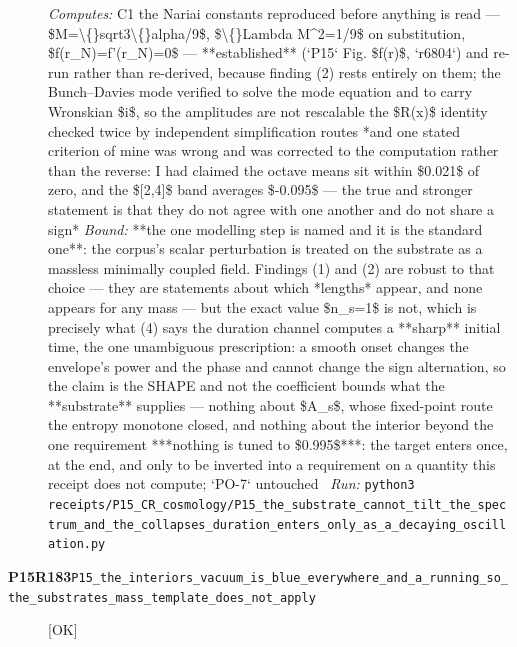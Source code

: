 \begin{description}
\emph{Computes:} C1 the Nariai constants reproduced before anything is read --- \$M=\textbackslash\{\}sqrt3\textbackslash\{\}alpha/9\$, \$\textbackslash\{\}Lambda M\textasciicircum{}2=1/9\$ on substitution, \$f(r\_N)=f'(r\_N)=0\$ --- **established** (`P15` Fig. \$f(r)\$, `r6804`) and re-run rather than re-derived, because finding (2) rests entirely on them; the Bunch--Davies mode verified to solve the mode equation and to carry Wronskian \$i\$, so the amplitudes are not rescalable  the \$R(x)\$ identity checked twice by independent simplification routes  *and one stated criterion of mine was wrong and was corrected to the computation rather than the reverse: I had claimed the octave means sit within \$0.021\$ of zero, and the \$[2,4]\$ band averages \$-0.095\$ --- the true and stronger statement is that they do not agree with one another and do not share a sign*
 \emph{Bound:}  **the one modelling step is named and it is the standard one**: the corpus's scalar perturbation is treated on the substrate as a massless minimally coupled field. Findings (1) and (2) are robust to that choice --- they are statements about which *lengths* appear, and none appears for any mass --- but the exact value \$n\_s=1\$ is not, which is precisely what (4) says  the duration channel computes a **sharp** initial time, the one unambiguous prescription: a smooth onset changes the envelope's power and the phase and cannot change the sign alternation, so the claim is the SHAPE and not the coefficient  bounds what the **substrate** supplies --- nothing about \$A\_s\$, whose fixed-point route the entropy monotone closed, and nothing about the interior beyond the one requirement  ***nothing is tuned to \$0.995\$***: the target enters once, at the end, and only to be inverted into a requirement on a quantity this receipt does not compute; `PO-7` untouched
\ \emph{Run:} \texttt{python3 receipts/P15\_CR\_cosmology/P15\_the\_substrate\_cannot\_tilt\_the\_spectrum\_and\_the\_collapses\_duration\_enters\_only\_as\_a\_decaying\_oscillation.py}
\item[\rcptlabel{P15_the_interiors_vacuum_is_blue_everywhere_and_a_running_so_the_substrates_mass_template_does_not_apply}{P15R183}\textbf{P15R183}\quad\texttt{P15\_the\_interiors\_vacuum\_is\_blue\_everywhere\_and\_a\_running\_so\_the\_substrates\_mass\_template\_does\_not\_apply}]\hfill\textsf{[OK]}\\

\end{description}
